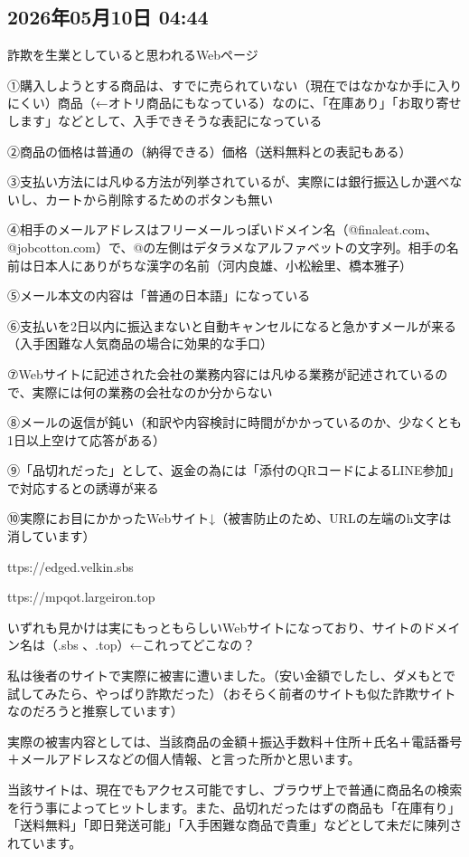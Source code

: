 \subsection*{2026年05月10日 04:44}

詐欺を生業としていると思われるWebページ

①購入しようとする商品は、すでに売られていない（現在ではなかなか手に入りにくい）商品（←オトリ商品にもなっている）なのに、「在庫あり」「お取り寄せします」などとして、入手できそうな表記になっている

②商品の価格は普通の（納得できる）価格（送料無料との表記もある）

③支払い方法には凡ゆる方法が列挙されているが、実際には銀行振込しか選べないし、カートから削除するためのボタンも無い

④相手のメールアドレスはフリーメールっぽいドメイン名（@finaleat.com、@jobcotton.com）で、@の左側はデタラメなアルファベットの文字列。相手の名前は日本人にありがちな漢字の名前（河内良雄、小松絵里、橋本雅子）

⑤メール本文の内容は「普通の日本語」になっている

⑥支払いを2日以内に振込まないと自動キャンセルになると急かすメールが来る（入手困難な人気商品の場合に効果的な手口）

⑦Webサイトに記述された会社の業務内容には凡ゆる業務が記述されているので、実際には何の業務の会社なのか分からない

⑧メールの返信が鈍い（和訳や内容検討に時間がかかっているのか、少なくとも1日以上空けて応答がある）

⑨「品切れだった」として、返金の為には「添付のQRコードによるLINE参加」で対応するとの誘導が来る

⑩実際にお目にかかったWebサイト↓（被害防止のため、URLの左端のh文字は消しています）

ttps://edged.velkin.sbs

ttps://mpqot.largeiron.top

いずれも見かけは実にもっともらしいWebサイトになっており、サイトのドメイン名は（.sbs 、.top）←これってどこなの？

私は後者のサイトで実際に被害に遭いました。（安い金額でしたし、ダメもとで試してみたら、やっぱり詐欺だった）（おそらく前者のサイトも似た詐欺サイトなのだろうと推察しています）

実際の被害内容としては、当該商品の金額＋振込手数料＋住所＋氏名＋電話番号＋メールアドレスなどの個人情報、と言った所かと思います。

当該サイトは、現在でもアクセス可能ですし、ブラウザ上で普通に商品名の検索を行う事によってヒットします。また、品切れだったはずの商品も「在庫有り」「送料無料」「即日発送可能」「入手困難な商品で貴重」などとして未だに陳列されています。

